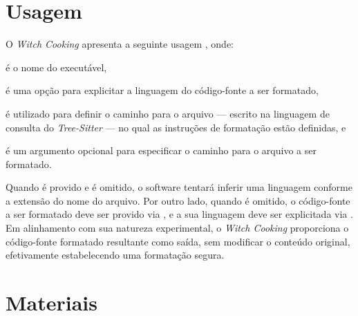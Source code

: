 \documentclass
  [11pt,a4paper,english,brazil,openright,sumario=tradicional,twoside]
  {abntex2}
\newcommand{\treesitter}{\textit{Tree-Sitter}\xspace}
\newcommand{\witchcooking}{\textit{Witch Cooking}\xspace}
\begin{document}

  \section{Usagem}
  \label{section:usage}

  O \witchcooking apresenta a seguinte usagem
  , onde:
  \begin{inparaenum}
    \item {} é o nome do executável,
    \item \codesnippetinline{[-l LANG]} é uma opção para explicitar a linguagem
          do código-fonte a ser formatado,
    \item {} é utilizado para definir o caminho para
          o arquivo --- escrito na linguagem de consulta do \treesitter{} ---
          no qual as instruções de formatação estão definidas, e
    \item \codesnippetinline{[SRC]} é um argumento opcional para especificar o
          caminho para o arquivo a ser formatado.
  \end{inparaenum}
  Quando \codesnippetinline{[SRC]} é provido e \codesnippetinline{[-l LANG]} é
  omitido, o software tentará inferir uma linguagem conforme a extensão do nome
  do arquivo. Por outro lado, quando \codesnippetinline{[SRC]} é omitido, o
  código-fonte a ser formatado deve ser provido via \textit{},
  e a sua linguagem deve ser explicitada via \codesnippetinline{[-l LANG]}. Em
  alinhamento com sua natureza experimental, o \witchcooking proporciona o
  código-fonte formatado resultante como saída, sem modificar o conteúdo
  original, efetivamente estabelecendo uma formatação segura.


  \section{Materiais}
\end{document}
